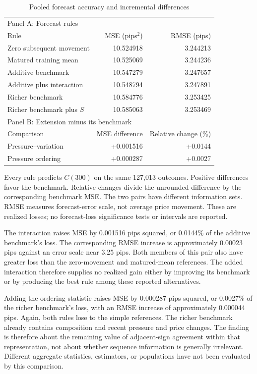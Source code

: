 \documentclass[12pt,letterpaper]{article}
\begin{document}
\begin{table}[htbp]\centering
\caption{Pooled forecast accuracy and incremental differences}\label{tab:forecast}
\begin{tabular}{lrr}\toprule
\multicolumn{3}{l}{Panel A: Forecast rules}\\
Rule & MSE (pips$^2$) & RMSE (pips)\\\midrule
Zero subsequent movement &10.524918&3.244213\\
Matured training mean &10.525069&3.244236\\
Additive benchmark &10.547279&3.247657\\
Additive plus interaction &10.548794&3.247891\\
Richer benchmark &10.584776&3.253425\\
Richer benchmark plus $S$ &10.585063&3.253469\\\midrule
\multicolumn{3}{l}{Panel B: Extension minus its benchmark}\\
Comparison & MSE difference & Relative change (\%)\\\midrule
Pressure--variation &+0.001516&+0.0144\\
Pressure ordering &+0.000287&+0.0027\\\bottomrule
\end{tabular}
\par\smallskip\begin{minipage}{0.94\linewidth}\footnotesize
Every rule predicts $C(300)$ on the same 127,013 outcomes. Positive differences favor the benchmark. Relative changes divide the unrounded difference by the corresponding benchmark MSE. The two pairs have different information sets. RMSE measures forecast-error scale, not average price movement. These are realized losses; no forecast-loss significance tests or intervals are reported.
\end{minipage}\end{table}

The interaction raises MSE by 0.001516 pips squared, or 0.0144\% of the additive benchmark's loss. The corresponding RMSE increase is approximately 0.00023 pips against an error scale near 3.25 pips. Both members of this pair also have greater loss than the zero-movement and matured-mean references. The added interaction therefore supplies no realized gain either by improving its benchmark or by producing the best rule among these reported alternatives.

Adding the ordering statistic raises MSE by 0.000287 pips squared, or 0.0027\% of the richer benchmark's loss, with an RMSE increase of approximately 0.000044 pips. Again, both rules lose to the simple references. The richer benchmark already contains composition and recent pressure and price changes. The finding is therefore about the remaining value of adjacent-sign agreement within that representation, not about whether sequence information is generally irrelevant. Different aggregate statistics, estimators, or populations have not been evaluated by this comparison.
\end{document}
